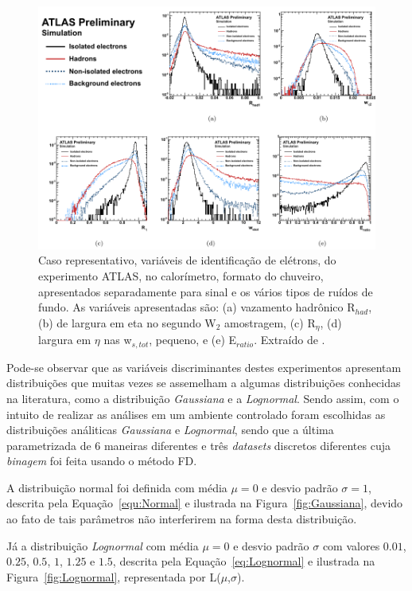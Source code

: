 \begin{figure}[H]
	\begin{center}
		\includegraphics[width=0.8\linewidth]{./figuras/variaveisATLAS.pdf}
		\caption{Caso representativo, variáveis de identificação de elétrons, do experimento ATLAS, no calorímetro, formato do chuveiro, apresentados separadamente para sinal e os vários tipos de ruídos de fundo. As variáveis apresentadas são: (a) vazamento hadrônico R${_{had}}$, (b) de largura em eta no segundo W${_2}$ amostragem, (c) R${_\eta}$, (d) largura em $\eta$ nas w${_{s,tot}}$, pequeno, e (e) E${_{ratio}}$. Extraído de \cite{alison2014road}.}\label{fig:16}
	\end{center}
\end{figure}

Pode-se observar que as variáveis discriminantes destes experimentos apresentam distribuições que muitas vezes se assemelham a algumas distribuições conhecidas na literatura, como a distribuição \textit{Gaussiana} e a \textit{Lognormal}. Sendo assim, com o intuito de realizar as análises em um ambiente controlado foram escolhidas as distribuições análiticas \textit{Gaussiana} e \textit{Lognormal}, sendo que a última parametrizada de 6 maneiras diferentes e três \textit{datasets} discretos diferentes cuja \textit{binagem} foi feita usando o método \ac{FD}.

A distribuição normal foi definida com média $ \mu =0 $ e desvio padrão $ \sigma = 1 $, descrita pela Equação~\eqref{equ:Normal} e ilustrada na Figura~\ref{fig:Gaussiana}, devido ao fato de tais parâmetros não interferirem na forma desta distribuição.


Já a distribuição \textit{Lognormal} com média $ \mu = 0 $ e desvio padrão $\sigma$ com valores $ 0.01 $, $ 0.25 $, $ 0.5 $, $ 1 $, $ 1.25 $ e $ 1.5 $, descrita pela Equação~\eqref{eq:Lognormal} e ilustrada na Figura~\ref{fig:Lognormal}, representada por L($ \mu $,$ \sigma $).

